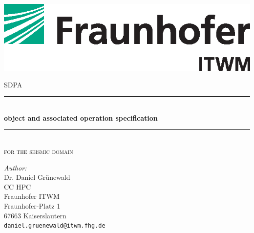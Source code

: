 \documentclass[12pt,a4paper]{article}
\newcommand{\HRule}{\rule{\linewidth}{0.5mm}}
\begin{document}

\begin{titlepage}
 
\begin{center}
 
 
\begin{flushright}
\includegraphics{./itwm_85mm_cmyk.eps}\\[2cm]
\end{flushright}
 
 
 
 
\textsc{\Large SDPA}\\[0.5cm]
\HRule \\[0.4cm]
{ \huge \bfseries object and associated operation specification }\\[0.4cm]
\HRule \\[0.4cm]
\textsc{\Large for the seismic domain}\\[0.5cm]

\vfill


\vfill
\begin{flushright}
\begin{minipage}{0.5\textwidth}
\begin{flushleft} %
 \emph{Author:}\\
 Dr. Daniel Gr\"unewald\\
 CC HPC\\
 Fraunhofer ITWM\\
 Fraunhofer-Platz 1\\
 67663 Kaiserslautern\\ 
 {\tt daniel.gruenewald@itwm.fhg.de}
\end{flushleft}
\end{minipage}
\end{flushright}
 
 
\end{center}
 
\end{titlepage}
\end{document}
